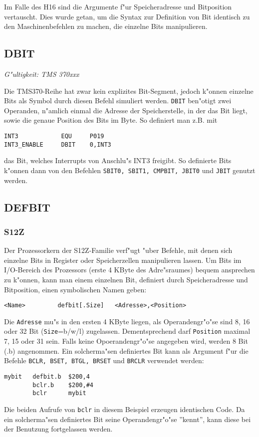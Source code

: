 \documentclass[12pt,a4paper,twoside]{report}
\makeatletter
\newcommand{\tty}[1]{{\tt #1}}
\newcommand{\ttindex}[1]{\index{#1@{\tt #1}}}
\makeatother
\begin{document}
Im Falle des H16 sind die Argumente f"ur Speicheradresse und Bitposition
vertauscht.  Dies wurde getan, um die Syntax zur Definition von Bit identisch
zu den Maschinenbefehlen zu machen, die einzelne Bits manipulieren.


\subsection{DBIT}
\ttindex{DBIT}

{\em G"ultigkeit: TMS 370xxx}

Die TMS370-Reihe hat zwar kein explizites Bit-Segment, jedoch k"onnen
einzelne Bits als Symbol durch diesen Befehl simuliert werden.  \tty{DBIT}
ben"otigt zwei Operanden, n"amlich einmal die Adresse der Speicherstelle,
in der das Bit liegt, sowie die genaue Position des Bits im Byte.
So definiert man z.B. mit
\begin{verbatim}
INT3            EQU     P019
INT3_ENABLE     DBIT    0,INT3
\end{verbatim}
das Bit, welches Interrupts von Anschlu"s INT3 freigibt.  So definierte
Bits k"onnen dann von den Befehlen \tty{SBIT0, SBIT1, CMPBIT, JBIT0}
und \tty{JBIT} genutzt werden.


\subsection{DEFBIT}
\ttindex{DEFBIT}

\subsubsection{S12Z}

Der Prozessorkern der S12Z-Familie verf"ugt "uber Befehle, mit denen
sich einzelne Bits in Register oder Speicherzellen manipulieren
lassen.  Um Bits im I/O-Bereich des Prozessors (erste 4 KByte des
Adre"sraumes) bequem ansprechen zu k"onnen, kann man einem einzelnen
Bit, definiert durch Speicheradresse und Bitposition, einen
symbolischen Namen geben:
\begin{verbatim}
<Name>         defbit[.Size]   <Adresse>,<Position>
\end{verbatim}
Die \tty{Adresse} mu"s in den ersten 4 KByte liegen, als Operandengr"o"se
sind 8, 16 oder 32 Bit (\tty{Size}=b/w/l) zugelassen.
Dementsprechend darf \tty{Position} maximal 7, 15 oder 31 sein. 
Falls keine Opoerandengr"o"se angegeben wird, werden 8 Bit (.b)
angenommen.  Ein solcherma"sen definiertes Bit kann als Argument f"ur
die Befehle {\tt BCLR, BSET, BTGL, BRSET} und {\tt BRCLR} verwendet
werden:
\begin{verbatim}
mybit   defbit.b  $200,4
        bclr.b    $200,#4
        bclr      mybit
\end{verbatim}
Die beiden Aufrufe von {\tt bclr} in diesem Beispiel erzeugen
identischen Code.  Da ein solcherma"sen definiertes Bit seine
Operandengr"o"se ''kennt'', kann diese bei der Benutzung fortgelassen
werden.
\end{document}

